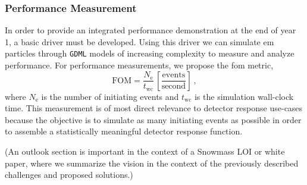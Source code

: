 \documentclass[10pt]{article}
\begin{document}
\subsubsection*{Performance Measurement}

In order to provide an integrated performance demonstration at the end
of year 1, a basic driver must be developed. Using this driver we can
simulate \ac{em} particles through \texttt{GDML} models of increasing
complexity to measure and analyze performance. For performance
measurements, we propose the \ac{fom} metric, 
\begin{equation}
  \textrm{FOM} = \frac{N_\textrm{e}}{t_{\textrm{wc}}}\,
  \left[\frac{\textrm{events}}{\textrm{second}}\right]\:,
\end{equation}
where $N_\textrm{e}$ is the number of initiating events and
$t_\textrm{wc}$ is the simulation wall-clock time. This measurement is
of most direct relevance to detector response use-cases because the
objective is to simulate as many initiating events as possible in order
to assemble a statistically meaningful detector response function.

(An outlook section is important in the context of a Snowmass LOI or white paper, where we summarize the vision in the context of the previously described challenges and proposed solutions.)
\pagebreak
\printbibliography

\end{document}
